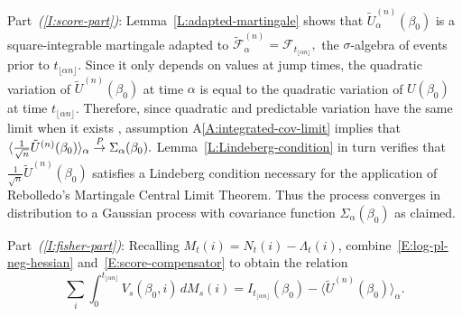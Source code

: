 \documentclass[final]{statsoc}
\begin{document}
Part~\textit{(\ref{I:score-part})}:
Lemma~\ref{L:adapted-martingale} shows that $\tilde U_\alpha^{(n)}(\beta_0)$
is a square-integrable martingale adapted to
\(
    \mathcal{\tilde F}^{(n)}_\alpha
        =
        \mathcal{F}_{t_{\lfloor \alpha n \rfloor}},
\)
the $\sigma$-algebra of events prior to
$t_{\lfloor \alpha n \rfloor}$.
Since it only depends on values at jump times, the
quadratic variation of $\tilde U^{(n)}(\beta_0)$ at time $\alpha$ is
equal to the quadratic variation of $U(\beta_0)$ at time
$t_{\lfloor \alpha n \rfloor}$.  Therefore, since quadratic and
predictable variation have the same limit when it exists
\citep[Prop.~1]{rebolledo1980central}, assumption
A\ref{A:integrated-cov-limit} implies that
\(
    \langle \frac{1}{\sqrt{n}} \tilde U^{(n)}(\beta_0) \rangle_\alpha
        \overset{\mathit{P}}{\to}
            \Sigma_\alpha(\beta_0).
\)
Lemma~\ref{L:Lindeberg-condition} in turn verifies that
$\frac{1}{\sqrt{n}} \tilde U^{(n)}(\beta_0)$ satisfies a Lindeberg
condition necessary for the application of Rebolledo's \citeyearpar{rebolledo1980central} Martingale Central
Limit Theorem.  Thus the process converges in
distribution to a Gaussian process with covariance function
$\Sigma_\alpha(\beta_0)$ as claimed.

Part~\textit{(\ref{I:fisher-part})}:
Recalling $M_t(i) = N_t(i) - \Lambda_t(i)$,
combine~\eqref{E:log-pl-neg-hessian} and~\eqref{E:score-compensator}
to obtain the relation
\begin{equation}\label{E:var-estimate-relation}
            \sum_i
            \int_0^{t_{\lfloor \alpha n \rfloor}}
                V_s(\beta_0, i) \, dM_s(i)
        =
            I_{t_{\lfloor \alpha n \rfloor}}(\beta_0)
        -
            \big\langle \tilde U^{(n)}(\beta_0) \big\rangle_\alpha.
\end{equation}
\end{document}
